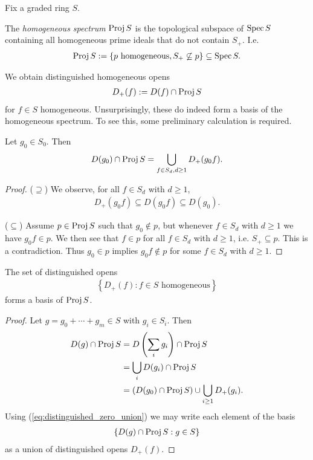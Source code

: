 \documentclass{article}
\begin{document}
Fix a graded ring $S$.

\begin{definition}
  The \emph{homogeneous spectrum} $\operatorname{Proj} S$
  is the topological subspace of $\operatorname{Spec} S$ containing all
  homogeneous prime ideals that do not contain $S_+$. I.e.
  \begin{align*}
    \operatorname{Proj} S := \left\lbrace{ \text{$p$ homogeneous}, S_+ \not\subseteq p }\right\rbrace \subseteq \operatorname{Spec} S.
  \end{align*}
\end{definition}

We obtain distinguished homogeneous opens
\begin{align*}
  D_+(f) := D(f) \cap \operatorname{Proj} S
\end{align*}
for $f\in S$ homogeneous.
Unsurprisingly, these do indeed form a basis of the homogeneous spectrum.
To see this, some preliminary calculation is required.

\begin{lemma}
  Let $g_0\in S_0$. Then
  \begin{align}\label{eq:distinguished_zero_union}
    D(g_0) \cap \operatorname{Proj} S = \bigcup_{f\in S_d, d\geq 1} D_+(g_0f).
  \end{align}
  \begin{proof}
    ($\supseteq$) We observe, for all $f\in S_d$ with $d\geq 1$,
    \begin{align*}
      D_+(g_0f) \subseteq D(g_0 f) \subseteq D(g_0).
    \end{align*}

    ($\subseteq$) Assume $p\in\operatorname{Proj} S$ such that $g_0\not\in p$, but whenever
    $f\in S_d$ with $d\geq 1$ we have $g_0f\in p$. We then see that $f\in p$
    for all $f\in S_d$ with $d\geq 1$, i.e. $S_+\subseteq p$. This is a
    contradiction. Thus $g_0\in p$ implies $g_0 f\not\in p$
    for some $f\in S_d$ with $d\geq 1$.
  \end{proof}
\end{lemma}

\begin{proposition}
  The set of distinguished opens
  \begin{align*}
    \left\lbrace{ D_+(f) : \text{$f\in S$ homogeneous}}\right\rbrace
  \end{align*}
  forms a basis of $\operatorname{Proj} S$.
  \begin{proof}
    Let $g=g_0+\cdots+g_m\in S$ with $g_i\in S_i$. Then
    \begin{align*}
      D(g)\cap\operatorname{Proj} S
      &= D\left({\sum_i g_i}\right) \cap \operatorname{Proj} S \\
      &= \bigcup_i D(g_i) \cap\operatorname{Proj} S \\
      &= (D(g_0)\cap\operatorname{Proj} S)\cup \bigcup_{i\geq 1} D_+(g_i).
    \end{align*}
    Using (\ref{eq:distinguished_zero_union}) we may write each element
    of the basis
    \begin{align*}
      \left\lbrace{D(g) \cap \operatorname{Proj}S : g\in S}\right\rbrace
    \end{align*}
    as a union of distinguished opens $D_+(f)$.
  \end{proof}
\end{proposition}
\end{document}
